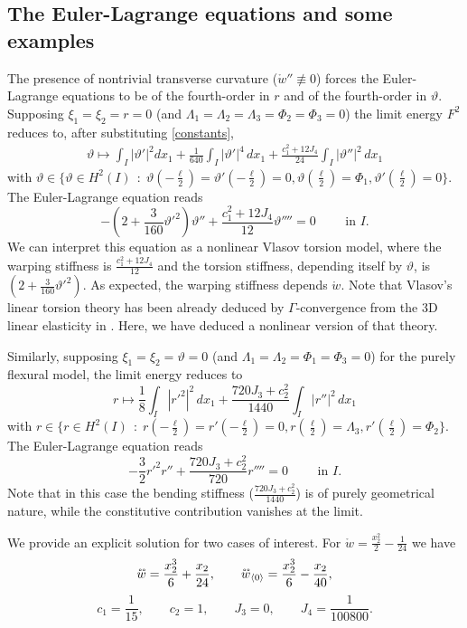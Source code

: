 \documentclass[a4, 11pt, reqno, final]{amsart}
\newcommand\ringring[1]{%
	{%
		\mathop{\kern0pt #1}\limits^{%
			\vbox to-1.85ex{
				\kern-2ex %
				\hbox to 0pt{\hss\normalfont\kern.1em \r{}\kern-.45em \r{}\hss}%
				\vss %
			}%
		}%
	}%
}
\theoremstyle{plain}%
\DeclareMathOperator{\st}{\,:\,}
\begin{document}
	\subsection{The Euler-Lagrange equations and some examples}
	The presence of nontrivial transverse curvature ($\mathring{w}'' \not\equiv 0$) forces the Euler-Lagrange equations to be of the fourth-order in $r$ and of the fourth-order in $\vartheta$.\\
	Supposing $\xi_1=\xi_2=r=0$ (and $\Lambda_1=\Lambda_2=\Lambda_3=\Phi_2=\Phi_3=0$) the limit energy $F^2$ reduces to, after substituting \eqref{constants},
	$$ \begin{aligned}
		\vartheta \mapsto \int_I |\vartheta'|^2 dx_1 + \frac{1}{640}\int_I |\vartheta'|^4 \, dx_1 +\frac{c_1^2 + 12J_4}{24} \int_I|\vartheta''|^2 \, dx_1
	\end{aligned}$$
	with $\vartheta \in \{\vartheta \in H^2(I) \st \vartheta(-\frac{\ell}{2}) = \vartheta'(-\frac{\ell}{2})=0, \vartheta(\frac{\ell}{2})=\Phi_1, \vartheta'(\frac{\ell}{2})=0 \}$.
	The Euler-Lagrange equation reads
	$$ -(2 + \frac{3}{160}\vartheta'^2)\vartheta'' + \frac{c_1^2 + 12J_4}{12}\vartheta''''=0 \qquad \text{ in } I.$$
	We can interpret this equation as a nonlinear Vlasov torsion model, where the warping stiffness is $\frac{c_1^2 + 12J_4}{12}$ and the torsion stiffness, depending itself by $\vartheta$, is $(2 + \frac{3}{160}\vartheta'^2)$. As expected, the warping stiffness depends $\mathring{w}$.  Note that Vlasov's linear torsion theory has been already deduced by $\Gamma$-convergence from the 3D linear elasticity in \cite{Freddi2007}. Here, we have deduced a nonlinear version of that theory.

	Similarly, supposing $\xi_1=\xi_2=\vartheta=0$ (and $\Lambda_1=\Lambda_2=\Phi_1=\Phi_3=0$) for the purely flexural model, the limit energy reduces to
	$$ r\mapsto \frac18 \int_I |r'^2|^2 \, dx_1 +\frac{720 J_3 +  c_2^2}{1440} \int_I |r''|^2 \, dx_1$$
	with  $r \in \{r \in H^2(I) \st r(-\frac{\ell}{2}) = r'(-\frac{\ell}{2})=0, r(\frac{\ell}{2})=\Lambda_3, r'(\frac{\ell}{2})=\Phi_2\}$.
	The Euler-Lagrange equation reads
	$$ -\frac32r'^2r'' + \frac{720 J_3 +  c_2^2}{720} r''''=0 \qquad \text{ in } I.$$
	Note that in this case the bending stiffness ($\frac{720 J_3 +  c_2^2}{1440}$) is of purely geometrical nature, while the constitutive contribution vanishes at the limit.



	We provide an explicit solution for two cases of interest.
	For $\mathring{w} = \frac{x_2^2}{2} - \frac{1}{24}$ we have
	$$ \ringring{w} = \frac{x_2^3}{6} + \frac{x_2}{24}, \qquad \ringring{w}_{\langle 0 \rangle} = \frac{x_2^3}{6} - \frac{x_2}{40},$$
	$$ c_1 = \frac{1}{15}, \qquad c_2 = 1, \qquad J_3 = 0, \qquad J_4 = \frac{1}{100800}.$$
\end{document}
